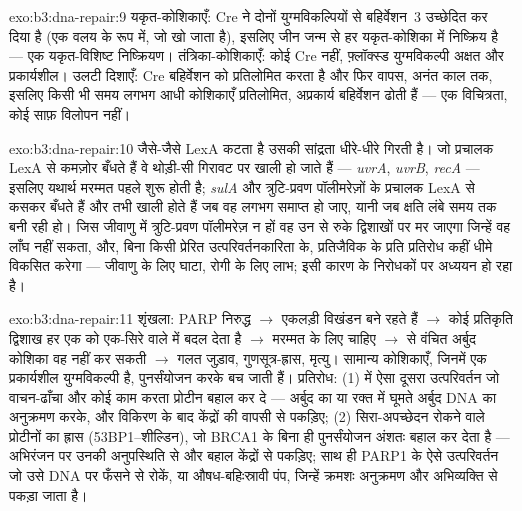 \begin{solution}{exo:b3:dna-repair:9}
यकृत-कोशिकाएँ: Cre ने दोनों युग्मविकल्पियों से बहिर्वेशन~3 उच्छेदित कर
दिया है (एक वलय के रूप में, जो खो जाता है), इसलिए जीन जन्म से हर
यकृत-कोशिका में निष्क्रिय है --- एक यकृत-विशिष्ट निष्क्रियण।
तंत्रिका-कोशिकाएँ: कोई Cre नहीं, फ़्लॉक्स्ड युग्मविकल्पी अक्षत और
प्रकार्यशील। उलटी दिशाएँ: Cre बहिर्वेशन को प्रतिलोमित करता है और फिर
वापस, अनंत काल तक, इसलिए किसी भी समय लगभग आधी कोशिकाएँ प्रतिलोमित,
अप्रकार्य बहिर्वेशन ढोती हैं --- एक विचित्रता, कोई साफ़ विलोपन नहीं।
\end{solution}

\begin{solution}{exo:b3:dna-repair:10}
जैसे-जैसे LexA कटता है उसकी सांद्रता धीरे-धीरे गिरती है। जो प्रचालक
LexA से कमज़ोर बँधते हैं वे थोड़ी-सी गिरावट पर खाली हो जाते हैं ---
\emph{uvrA}, \emph{uvrB}, \emph{recA} --- इसलिए यथार्थ मरम्मत पहले
शुरू होती है; \emph{sulA} और त्रुटि-प्रवण पॉलीमरेज़ों के प्रचालक LexA
से कसकर बँधते हैं और तभी खाली होते हैं जब वह लगभग समाप्त हो जाए, यानी
जब क्षति लंबे समय तक बनी रही हो। जिस जीवाणु में त्रुटि-प्रवण
पॉलीमरेज़ न हों वह उन  से रुके द्विशाखों पर मर जाएगा जिन्हें
वह लाँघ नहीं सकता, और, बिना किसी प्रेरित उत्परिवर्तनकारिता के,
प्रतिजैविक के प्रति प्रतिरोध कहीं धीमे विकसित करेगा --- जीवाणु के लिए
घाटा, रोगी के लिए लाभ; इसी कारण  के निरोधकों पर अध्ययन हो रहा है।
\end{solution}

\begin{solution}{exo:b3:dna-repair:11}
शृंखला: PARP निरुद्ध $\to$ एकलड़ी विखंडन बने रहते हैं $\to$ कोई
प्रतिकृति द्विशाख हर एक को एक-सिरे वाले  में बदल देता है
$\to$ मरम्मत के लिए  चाहिए $\to$  से वंचित अर्बुद
कोशिका वह नहीं कर सकती $\to$ गलत जुड़ाव, गुणसूत्र-ह्रास, मृत्यु।
सामान्य कोशिकाएँ, जिनमें एक प्रकार्यशील युग्मविकल्पी है, पुनर्संयोजन
करके बच जाती हैं। प्रतिरोध: (1) \emph{} में ऐसा दूसरा उत्परिवर्तन
जो वाचन-ढाँचा और कोई काम करता प्रोटीन बहाल कर दे --- अर्बुद का या रक्त
में घूमते अर्बुद DNA का अनुक्रमण करके, और विकिरण के बाद  केंद्रों
की वापसी से पकड़िए; (2) सिरा-अपच्छेदन रोकने वाले प्रोटीनों का ह्रास
(53BP1--शील्डिन), जो BRCA1 के बिना ही पुनर्संयोजन अंशतः बहाल कर देता
है --- अभिरंजन पर उनकी अनुपस्थिति से और बहाल  केंद्रों से पकड़िए;
साथ ही PARP1 के ऐसे उत्परिवर्तन जो उसे DNA पर फँसने से रोकें, या
औषध-बहिःस्रावी पंप, जिन्हें क्रमशः अनुक्रमण और अभिव्यक्ति से पकड़ा जाता है।
\end{solution}

